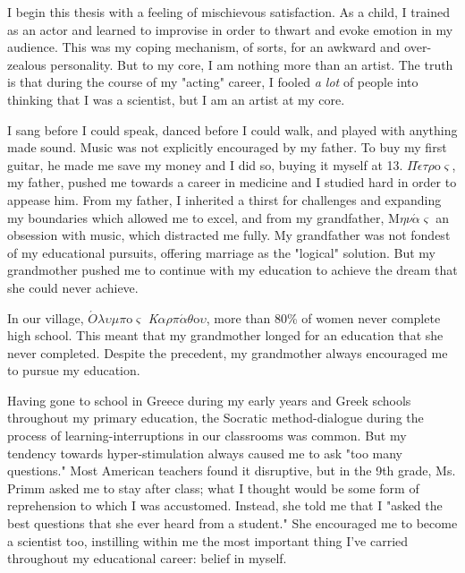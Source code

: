 \documentclass[12pt]{ucsddissertation}
\begin{document}
{\begin{tabular}{@{}l l}
\end{tabular}

\bigskip %


}

\listoffigures
\listofscheme
\listoftables


\begin{preface}
I begin this thesis with a feeling of mischievous satisfaction. As a child, I trained as an actor and learned to improvise in order to thwart and evoke emotion in my audience. This was my coping mechanism, of sorts, for an awkward and over-zealous personality. But to my core, I am nothing more than an artist. The truth is that during the course of my "acting" career, I fooled \textit{a lot} of people into thinking that I was a scientist, but I am an artist at my core. 

I sang before I could speak, danced before I could walk, and played with anything made sound. Music was not explicitly encouraged by my father. To buy my first guitar, he made me save my money and I did so, buying it myself at 13. $\Pi\acute{\epsilon}\tau\rho$o$\varsigma$, my father, pushed me towards a career in medicine and I studied hard in order to appease him. From my father, I inherited a thirst for challenges and expanding my boundaries which allowed me to excel, and from my grandfather, M$\eta\nu\acute{\alpha}\varsigma$ an obsession with music, which distracted me fully. My grandfather was not fondest of my educational pursuits, offering marriage as the "logical" solution. But my grandmother pushed me to continue with my education to achieve the dream that she could never achieve. 

In our village, $\acute{O}\lambda\upsilon\mu\pi$o$\varsigma$ \textit{K}$\alpha\rho\pi\acute{\alpha}\theta$o$\upsilon$, more than 80\% of women never complete high school. This meant that my grandmother longed for an education that she never completed. Despite the precedent, my grandmother always encouraged me to pursue my education.

Having gone to school in Greece during my early years and Greek schools throughout my primary education, the Socratic method-dialogue during the process of learning-interruptions in our classrooms was common. But my tendency towards hyper-stimulation always caused me to ask "too many questions." Most American teachers found it disruptive, but in the 9th grade, Ms. Primm asked me to stay after class; what I thought would be some form of reprehension to which I was accustomed. Instead, she told me that I "asked the best questions that she ever heard from a student." She encouraged me to become a scientist too, instilling within me the most important thing I've carried throughout my educational career: belief in myself.


\end{preface}
\end{document}
